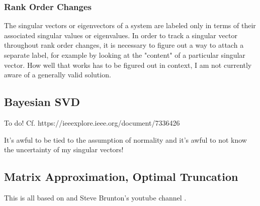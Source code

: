 \subsubsection{Rank Order Changes}

The singular vectors or eigenvectors of a system are labeled only in terms of their associated singular values or eigenvalues. In order to track a singular vector throughout rank order changes, it is necessary to figure out a way to attach a separate label, for example by looking at the "content" of a particular singular vector. How well that works has to be figured out in context, I am not currently aware of a generally valid solution. 


\subsection{Bayesian SVD}
To do! Cf. https://ieeexplore.ieee.org/document/7336426

It's awful to be tied to the assumption of normality and it's awful to not know the uncertainty of my singular vectors!


\subsection{Matrix Approximation, Optimal Truncation}
\label{sec:svd_truncation}

This is all based on \cite{gavish2013optimal} and Steve Brunton's youtube channel \cite{stevebrunton}.

